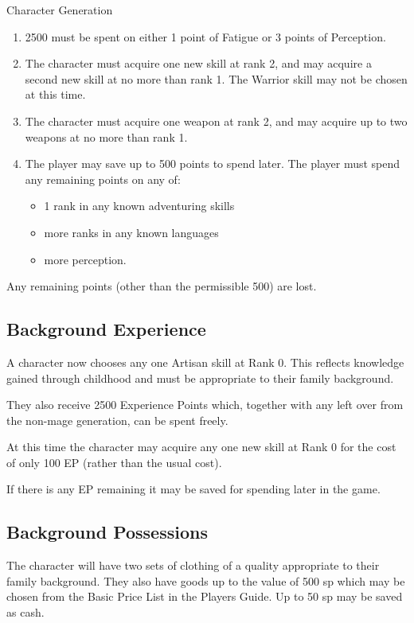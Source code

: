 \begin{Chapter}{Character Generation}
\begin{enumerate}
\item 2500 must be spent on either 1 point of Fatigue 
or 3 points of Perception. 

\item The character must acquire one new skill at rank 2, and may
  acquire a second new skill at no more than rank 1. The Warrior skill
  may not be chosen at this time.

\item The character must acquire one weapon at rank 2, and may acquire
  up to two weapons at no more than rank 1.

\item The player may save up to 500 points to spend later.  The player
  must spend any remaining points on any of:

  \begin{itemize}
    \item 1 rank in any known adventuring skills  
    \item more ranks in any known languages
    \item more perception. 
  \end{itemize}

\end{enumerate}

Any remaining points (other than the permissible 500) are lost.

\subsection{Background Experience}

A character now chooses any one Artisan skill at Rank 0.  This
reflects knowledge gained through childhood and must be appropriate to
their family background.

They also receive 2500 Experience Points which, together with any left
over from the non-mage generation, can be spent freely.

At this time the character may acquire any one new skill at Rank 0 for
the cost of only 100 EP (rather than the usual cost).

If there is any EP remaining it may be saved for spending later in the
game.

\subsection{Background Possessions}

The character will have two sets of clothing of a quality appropriate
to their family background.  They also have goods up to the value of
500 sp which may be chosen from the Basic Price List in the Players
Guide.  Up to 50 sp may be saved as cash.


\end{Chapter}
